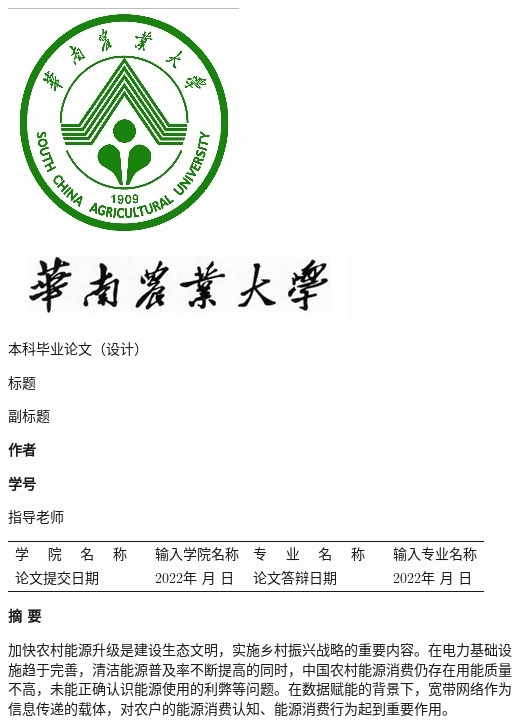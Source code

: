 \documentclass[a4paper, 12pt, oneside]{article} %
\begin{document}
	\thispagestyle{empty}
	\vspace{2em}
	\includegraphics{校徽.jpg}
	\vspace{2em}
	\begin{center}
		\includegraphics{校名.jpg}
	\end{center}
	\vspace{5em}
	\centerline{ \songti 本科毕业论文（设计）}
	\vspace{5em}
	\begin{center}
		{ \heiti 标题}
		
		\vspace{3em}
		{ \songti 副标题}
	\end{center}
	\vspace{5em}
	\centerline{\textbf{作者}}
	\centerline{\textbf{学号}}
	\vspace{4em}
	\centerline{指导老师 }
	\vspace{5em}
	\begin{center}	
		\begin{tabular}{llllll}
			学 \ \ 院 \ \ 名 \ \ 称   &  & 输入学院名称     & 专 \ \ 业 \ \ 名 \ \ 称   &  & 输入专业名称 \\ \cline{3-3} \cline{6-6} 
			论文提交日期 &  & 2022年 月  日 & 论文答辩日期 &  & 2022年 月  日    \\ \cline{3-3} \cline{6-6} 
		\end{tabular}
	\end{center}

	\newpage %
	\setcounter{page}{1}
	\centerline{\textbf{摘 \quad \quad 要}}
		加快农村能源升级是建设生态文明，实施乡村振兴战略的重要内容。在电力基础设施趋于完善，清洁能源普及率不断提高的同时，中国农村能源消费仍存在用能质量不高，未能正确认识能源使用的利弊等问题。在数据赋能的背景下，宽带网络作为信息传递的载体，对农户的能源消费认知、能源消费行为起到重要作用。
		
\end{document}
